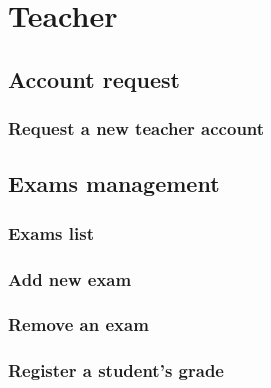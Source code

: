 \documentclass[ManualeUtente]{subfiles}
\begin{document}
\chapter{Teacher}
\section{Account request}
\subsection{Request a new teacher account}
\section{Exams management}
\subsection{Exams list}
\subsection{Add new exam}
\subsection{Remove an exam}
\subsection{Register a student's grade}
\end{document}
